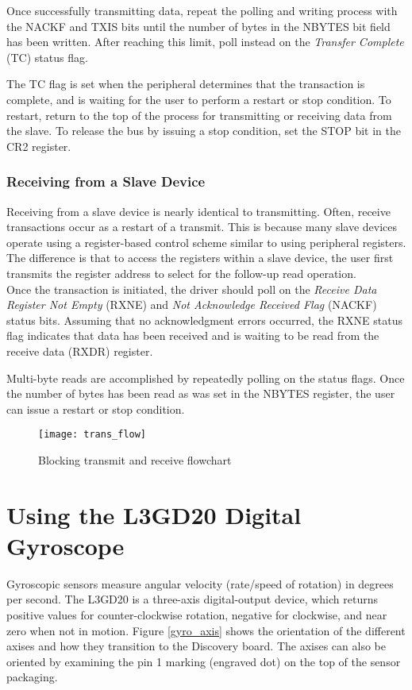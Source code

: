 \documentclass[11pt,fleqn]{book} %
\begin{document}
        Once successfully transmitting data, repeat the polling and writing process with the NACKF and TXIS bits until the number of bytes in the NBYTES bit field has been written. After reaching this limit, poll instead on the \textit{Transfer Complete} (TC) status flag. 
        
        The TC flag is set when the peripheral determines that the transaction is complete, and is waiting for the user to perform a restart or stop condition. To restart, return to the top of the process for transmitting or receiving data from the slave. To release the bus by issuing a stop condition, set the STOP bit in the CR2 register.  
    
    \subsubsection{Receiving from a Slave Device}
        Receiving from a slave device is nearly identical to transmitting. Often, receive transactions occur as a restart of a transmit. This is because many slave devices operate using a register-based control scheme similar to using peripheral registers. The difference is that to access the registers within a slave device, the user first transmits the register address to select for the follow-up read operation. \\
        
        Once the transaction is initiated, the driver should poll on the \textit{Receive Data Register Not Empty} (RXNE) and \textit{Not Acknowledge Received Flag} (NACKF) status bits. Assuming that no acknowledgment errors occurred, the RXNE status flag indicates that data has been received and is waiting to be read from the receive data (RXDR) register.  
        
        Multi-byte reads are accomplished by repeatedly polling on the status flags. Once the number of bytes has been read as was set in the NBYTES register, the user can issue a restart or stop condition.  
    
    \begin{figure}[]
       \centering\texttt{[image: trans\_flow]}
       \caption{Blocking transmit and receive flowchart}
       \label{trans_flow}
    \end{figure}

\section{Using the L3GD20 Digital Gyroscope}
Gyroscopic sensors measure angular velocity (rate/speed of rotation) in degrees per second. The L3GD20 is a three-axis digital-output device, which returns positive values for counter-clockwise rotation, negative for clockwise, and near zero when not in motion. Figure \ref{gyro_axis} shows the orientation of the different axises and how they transition to the Discovery board. The axises can also be oriented by examining the pin 1 marking (engraved dot) on the top of the sensor packaging.  
\end{document}
